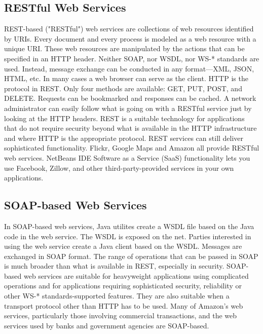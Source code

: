 \documentclass[12pt,a4paper,final,twoside,onecolumn,titlepage]{book}
\begin{document}
\subsection{RESTful Web Services}
REST-based ("RESTful") web services are collections of web resources identified by URIs. Every document and every process is modeled as a web resource with a unique URI. These web resources are manipulated by the actions that can be specified in an HTTP header. Neither SOAP, nor WSDL, nor WS-* standards are used. Instead, message exchange can be conducted in any format—XML, JSON, HTML, etc. In many cases a web browser can serve as the client.
HTTP is the protocol in REST. Only four methods are available: GET, PUT, POST, and DELETE. Requests can be bookmarked and responses can be cached. A network administrator can easily follow what is going on with a RESTful service just by looking at the HTTP headers.
REST is a suitable technology for applications that do not require security beyond what is available in the HTTP infrastructure and where HTTP is the appropriate protocol. REST services can still deliver sophisticated functionality. Flickr, Google Maps and Amazon all provide RESTful web services. NetBeans IDE Software as a Service (SaaS) functionality lets you use Facebook, Zillow, and other third-party-provided services in your own applications.
\subsection{SOAP-based Web Services}
In SOAP-based web services, Java utilites create a WSDL file based on the Java code in the web service. The WSDL is exposed on the net. Parties interested in using the web service create a Java client based on the WSDL. Messages are exchanged in SOAP format. The range of operations that can be passed in SOAP is much broader than what is available in REST, especially in security.
SOAP-based web services are suitable for heavyweight applications using complicated operations and for applications requiring sophisticated security, reliability or other WS-* standards-supported features. They are also suitable when a transport protocol other than HTTP has to be used. Many of Amazon's web services, particularly those involving commercial transactions, and the web services used by banks and government agencies are SOAP-based.


\end{document}
